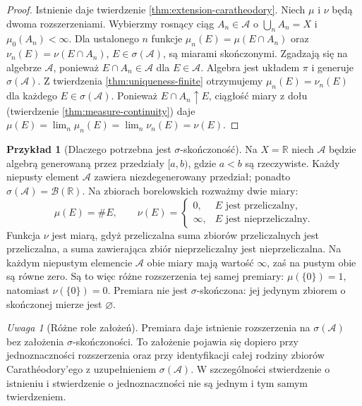\documentclass[11pt,a4paper,oneside]{book}
\numberwithin{equation}{chapter}
\theoremstyle{plain}
\theoremstyle{definition}
\newtheorem{przyklad}[twierdzenie]{Przykład}
\theoremstyle{remark}
\newtheorem{uwaga}[twierdzenie]{Uwaga}
\begin{document}
\begin{proof}
Istnienie daje twierdzenie \ref{thm:extension-caratheodory}.
Niech $\mu$ i $\nu$ będą dwoma rozszerzeniami.
Wybierzmy rosnący ciąg $A_n\in\mathcal A$ o
$\bigcup_n A_n=X$ i $\mu_0(A_n)<\infty$.
Dla ustalonego $n$ funkcje
$\mu_n(E)=\mu(E\cap A_n)$ oraz $\nu_n(E)=\nu(E\cap A_n)$,
$E\in\sigma(\mathcal A)$, są miarami skończonymi.
Zgadzają się na algebrze $\mathcal A$, ponieważ
$E\cap A_n\in\mathcal A$ dla $E\in\mathcal A$.
Algebra jest układem $\pi$ i generuje
$\sigma(\mathcal A)$. Z twierdzenia
\ref{thm:uniqueness-finite} otrzymujemy
$\mu_n(E)=\nu_n(E)$ dla każdego $E\in\sigma(\mathcal A)$.
Ponieważ $E\cap A_n\uparrow E$, ciągłość miary z dołu
(twierdzenie \ref{thm:measure-continuity}) daje
$\mu(E)=\lim_n\mu_n(E)=\lim_n\nu_n(E)=\nu(E)$.
\end{proof}

\begin{przyklad}[Dlaczego potrzebna jest $\sigma$-skończoność]
\label{ex:nonunique-extension}
Na $X=\mathbb R$ niech $\mathcal A$ będzie algebrą
generowaną przez przedziały $[a,b)$, gdzie $a<b$ są
rzeczywiste. Każdy niepusty element $\mathcal A$ zawiera
niezdegenerowany przedział; ponadto
$\sigma(\mathcal A)=\mathcal B(\mathbb R)$.
Na zbiorach borelowskich rozważmy dwie miary:
\[
\mu(E)=\#E,\qquad
\nu(E)=\begin{cases}0,&E\text{ jest przeliczalny},\\
\infty,&E\text{ jest nieprzeliczalny}.
\end{cases}
\]
Funkcja $\nu$ jest miarą, gdyż przeliczalna suma zbiorów
przeliczalnych jest przeliczalna, a suma zawierająca
zbiór nieprzeliczalny jest nieprzeliczalna. Na każdym
niepustym elemencie $\mathcal A$ obie miary mają wartość
$\infty$, zaś na pustym obie są równe zero. Są to więc
różne rozszerzenia tej samej premiary:
$\mu(\{0\})=1$, natomiast $\nu(\{0\})=0$.
Premiara nie jest $\sigma$-skończona: jej jedynym
zbiorem o skończonej mierze jest $\varnothing$.
\end{przyklad}

\begin{uwaga}[Różne role założeń]
Premiara daje istnienie rozszerzenia na $\sigma(\mathcal A)$
bez założenia $\sigma$-skończoności. To założenie pojawia się
dopiero przy jednoznaczności rozszerzenia oraz przy
identyfikacji całej rodziny zbiorów Carathéodory'ego
z uzupełnieniem $\sigma(\mathcal A)$. W szczególności
stwierdzenie o istnieniu i stwierdzenie o jednoznaczności
nie są jednym i tym samym twierdzeniem.
\end{uwaga}
\end{document}
